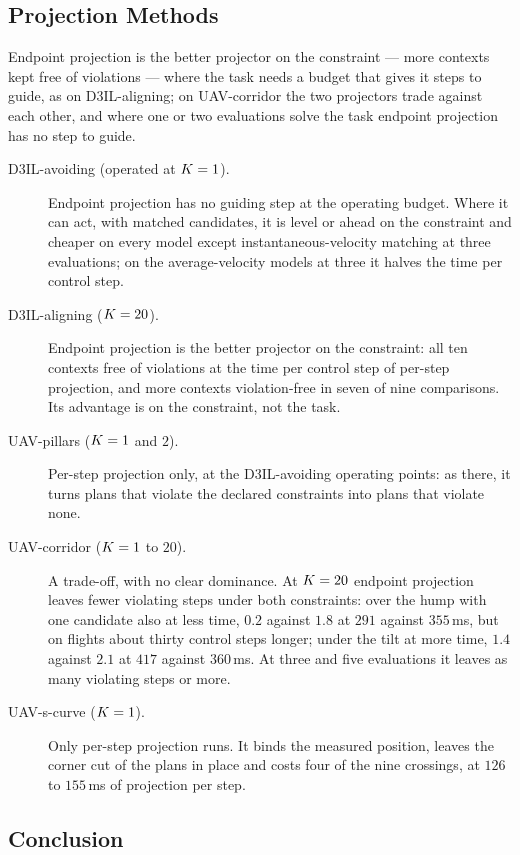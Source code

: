 \subsection{Projection Methods}\label{sec:res:constraints}

Endpoint projection is the better projector on the constraint --- more contexts kept free of violations --- where the task needs a budget that gives it
steps to guide, as on D3IL-aligning; on UAV-corridor the two projectors trade against each other, and where one
or two evaluations solve the task endpoint projection has no step to guide.

\begin{description}
  \item[D3IL-avoiding (operated at $K=1$).] Endpoint projection has no guiding step at the operating
    budget. Where it can act, with matched candidates, it is level or ahead on the constraint and cheaper on
    every model except instantaneous-velocity matching at three evaluations; on the average-velocity models
    at three it halves the time per control step.
  \item[D3IL-aligning ($K=20$).] Endpoint projection is the better projector on the constraint: all ten
    contexts free of violations at the time per control step of per-step projection, and more contexts
    violation-free in seven of nine comparisons. Its advantage is on the constraint, not the task.
  \item[UAV-pillars ($K=1$ and $2$).] Per-step projection only, at the D3IL-avoiding operating points: as
    there, it turns plans that violate the declared constraints into plans that violate none.
  \item[UAV-corridor ($K=1$ to $20$).] A trade-off, with no clear dominance. At $K=20$ endpoint
    projection leaves fewer violating steps under both constraints: over the hump with one candidate also at
    less time, $0.2$ against $1.8$ at $291$ against $355$\,ms, but on flights about thirty control steps
    longer; under the tilt at more time, $1.4$ against $2.1$ at $417$ against $360$\,ms. At three and five
    evaluations it leaves as many violating steps or more.
  \item[UAV-s-curve ($K=1$).] Only per-step projection runs. It binds the measured position, leaves the
    corner cut of the plans in place and costs four of the nine crossings, at $126$ to $155$\,ms of
    projection per step.
\end{description}

\subsection{Conclusion}\label{sec:res:summary:conclusion}

